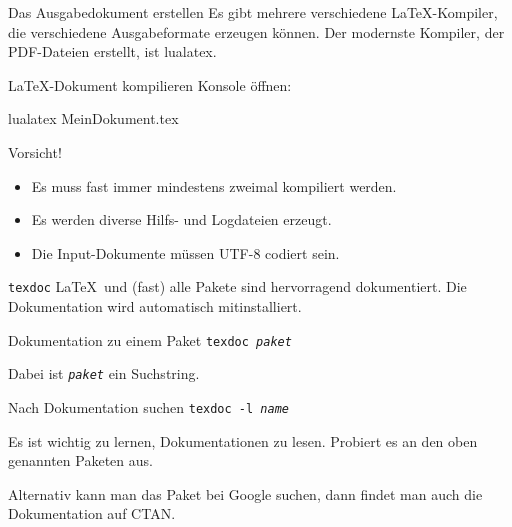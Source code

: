 \begin{frame}[fragile]{Das Ausgabedokument erstellen}
  Es gibt mehrere verschiedene \LaTeX-Kompiler, die verschiedene Ausgabeformate erzeugen können.
  Der modernste Kompiler, der PDF-Dateien erstellt, ist \alert{lualatex}.

  \begin{block}{\LaTeX-Dokument kompilieren}
    Konsole öffnen:
    \begin{lstverbatim}
    lualatex MeinDokument.tex
    \end{lstverbatim}
  \end{block}
  \begin{alertblock}{Vorsicht!}
    \begin{itemize}
      \item Es muss fast immer mindestens zweimal kompiliert werden.
      \item Es werden diverse Hilfs- und Logdateien erzeugt.
      \item Die Input-Dokumente müssen UTF-8 codiert sein.
    \end{itemize}
  \end{alertblock}
\end{frame}

\begin{frame}{\texttt{texdoc}}
  \LaTeX\ und (fast) alle Pakete sind hervorragend dokumentiert. Die Dokumentation wird automatisch mitinstalliert.
  \begin{block}{Dokumentation zu einem Paket}
    \texttt{texdoc \textit{paket}}
  \end{block}

  Dabei ist \texttt{\textit{paket}} ein Suchstring.
  \begin{block}{Nach Dokumentation suchen}
    \texttt{texdoc -l \textit{name}}
  \end{block}

  Es ist wichtig zu lernen, Dokumentationen zu lesen. Probiert es an den oben genannten Paketen aus.

  \vspace{10pt}
  Alternativ kann man das Paket bei Google suchen, dann findet man auch die Dokumentation auf CTAN.
\end{frame}
